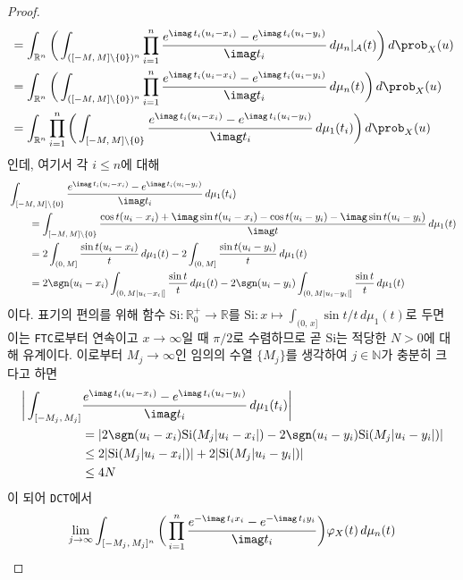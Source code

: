 \begin{proof}
\begin{align*}
        &=\int_{\mathbb{R}^n}\bigg(\int_{([-M,\,M]\setminus\{0\})^n}\prod_{i=1}^n\frac{e^{\imag\,t_i(u_i-x_i)}-e^{\imag\,t_i(u_i-y_i)}}{\imag t_i}\,d\mu_n\vert_\mathcal{A}(t)\bigg)\,d\prob_X(u)\\
        &=\int_{\mathbb{R}^n}\bigg(\int_{([-M,\,M]\setminus\{0\})^n}\prod_{i=1}^n\frac{e^{\imag\,t_i(u_i-x_i)}-e^{\imag\,t_i(u_i-y_i)}}{\imag t_i}\,d\mu_n(t)\bigg)\,d\prob_X(u)\\
        &=\int_{\mathbb{R}^n}\prod_{i=1}^n\bigg(\int_{[-M,\,M]\setminus\{0\}}\frac{e^{\imag\,t_i(u_i-x_i)}-e^{\imag\,t_i(u_i-y_i)}}{\imag t_i}\,d\mu_1(t_i)\bigg)\,d\prob_X(u)
    \end{align*}
    인데, 여기서 각 $i\leq n$에 대해
    \begin{align*}
        &\int_{[-M,\,M]\setminus\{0\}}\frac{e^{\imag\,t_i(u_i-x_i)}-e^{\imag\,t_i(u_i-y_i)}}{\imag t_i}\,d\mu_1(t_i)\\
        &\qquad=\int_{[-M,\,M]\setminus\{0\}}\frac{\cos t(u_i-x_i)+\imag\sin t(u_i-x_i)-\cos t(u_i-y_i)-\imag\sin t(u_i-y_i)}{\imag t}\,d\mu_1(t)\\
        &\qquad=2\int_{(0,\,M]}\frac{\sin t(u_i-x_i)}{t}\,d\mu_1(t)-2\int_{(0,\,M]}\frac{\sin t(u_i-y_i)}{t}\,d\mu_1(t)\\
        &\qquad=2\sgn(u_i-x_i)\int_{(0,\,M|u_i-x_i|]}\frac{\sin t}{t}\,d\mu_1(t)-2\sgn(u_i-y_i)\int_{(0,\,M|u_i-y_i|]}\frac{\sin t}{t}\,d\mu_1(t)
    \end{align*}
    이다. 표기의 편의를 위해 함수 $\mathrm{Si}:\mathbb{R}^+_0\to\mathbb{R}$를 $\mathrm{Si}:x\mapsto\int_{(0,\,x]}\sin t/t\,d\mu_1(t)$로 두면 이는 \texttt{FTC}로부터 연속이고 $x\to\infty$일 때 $\pi/2$로 수렴하므로 곧 $\mathrm{Si}$는 적당한 $N>0$에 대해 유계이다. 이로부터 $M_j\to\infty$인 임의의 수열 $\{M_j\}$를 생각하여 $j\in\mathbb{N}$가 충분히 크다고 하면
    \begin{align*}
        \bigg|\int_{[-M_j,\,M_j]}&\frac{e^{\imag\,t_i(u_i-x_i)}-e^{\imag\,t_i(u_i-y_i)}}{\imag t_i}\,d\mu_1(t_i)\bigg|\\
        &=|2\sgn(u_i-x_i)\mathrm{Si}(M_j|u_i-x_i|)-2\sgn(u_i-y_i)\mathrm{Si}(M_j|u_i-y_i|)|\\
        &\leq2|\mathrm{Si}(M_j|u_i-x_i|)|+2|\mathrm{Si}(M_j|u_i-y_i|)|\\
        &\leq4N
    \end{align*}
    이 되어 \texttt{DCT}에서
    \begin{align*}
        \lim_{j\to\infty}&\int_{[-M_j,\,M_j]^n}\bigg(\prod_{i=1}^n\frac{e^{-\imag\,t_ix_i}-e^{-\imag\,t_iy_i}}{\imag t_i}\bigg)\varphi_X(t)\,d\mu_n(t)\\

\end{align*}
\end{proof}
